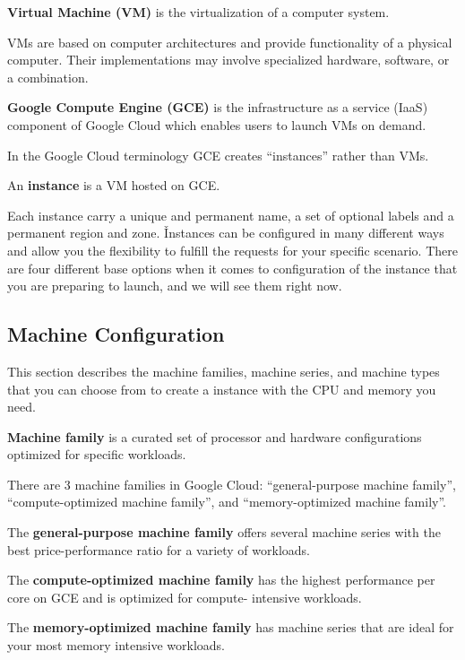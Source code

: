 \textbf{Virtual Machine (VM)} is the virtualization of a computer system.
\ed

VMs are based on computer architectures and provide functionality of a physical computer. Their implementations may
involve specialized hardware, software, or a combination.

\textbf{Google Compute Engine (GCE)} is the infrastructure as a service (IaaS) component of Google Cloud which enables
users to launch VMs on demand.
\ed

In the Google Cloud terminology GCE creates ``instances'' rather than VMs.

\bd[Instance]
An \textbf{instance} is a VM hosted on GCE.
\ed

Each instance carry a unique and permanent name, a set of optional labels and a permanent region and zone. \v

Instances can be configured in many different ways and allow you the flexibility to fulfill the requests for your
specific scenario. There are four different base options when it comes to configuration of the instance that you are
preparing to launch, and we will see them right now.

\subsection{Machine Configuration}

This section describes the machine families, machine series, and machine types that you can choose from to create a
instance with the CPU and memory you need.

\textbf{Machine family} is a curated set of processor and hardware configurations optimized for specific workloads.
\ed

There are 3 machine families in Google Cloud: ``general-purpose machine family'', ``compute-optimized machine family'',
and ``memory-optimized machine family''.

The \textbf{general-purpose machine family} offers several machine series with the best price-performance ratio for a
variety of workloads.
\ed

The \textbf{compute-optimized machine family} has the highest performance per core on GCE and is optimized for compute-
intensive workloads.
\ed

The \textbf{memory-optimized machine family} has machine series that are ideal for your most memory intensive workloads.
\ed

